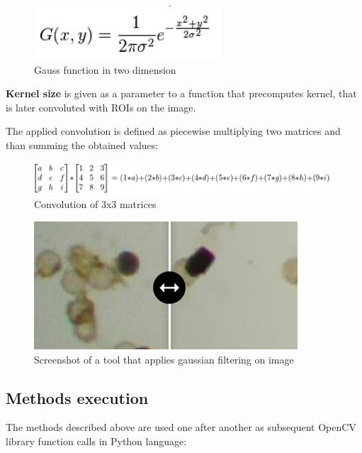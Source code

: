 \documentclass[12pt,twoside,a4paper]{article}
\begin{document}
\begin{figure}[H]
\centering
\includegraphics[width=0.4\paperwidth]{gauss}
\caption{Gauss function in two dimension\cite{featproc}}\label{fig:featproc}
\end{figure}


\textbf{Kernel size} is given as a parameter to a function that precomputes kernel, that is later convoluted with ROIs on the image.

The applied convolution is defined as piecewise multiplying two matrices and than summing the obtained values:

 
\begin{figure}[H]
\centering
\includegraphics[width=0.8\paperwidth]{conv}
\caption{Convolution of 3x3 matrices\cite{gimp}}\label{fig:conv}
\end{figure}

 
\begin{figure}[H]
\centering
\includegraphics[width=0.4\paperwidth]{micro}
\caption{Screenshot of a tool that applies gaussian filtering on image\cite{cnoisy}}\label{fig:micro}
\end{figure}

  



\subsection{Methods execution}


The methods described above are used one after another as subsequent OpenCV library function calls in Python language:
\end{document}
